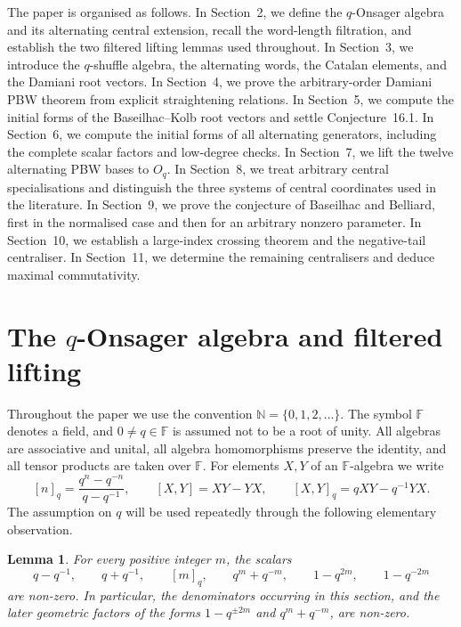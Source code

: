 \documentclass[11pt]{extarticle}
\newtheorem{lemma}[theorem]{Lemma}
\theoremstyle{definition}
\theoremstyle{remark}
\numberwithin{equation}{section}
\newcommand{\F}{\mathbb F}
\newcommand{\N}{\mathbb N}
\newcommand{\Oq}{O_q}
\newcommand{\qcomm}[2]{[ #1,#2 ]_q}
\newcommand{\comm}[2]{[ #1,#2 ]}
\begin{document}
The paper is organised as follows.  In Section~2, we define the
$q$-Onsager algebra and its alternating central extension, recall the
word-length filtration, and establish the two filtered lifting lemmas used
throughout.  In Section~3, we introduce the $q$-shuffle algebra, the
alternating words, the Catalan elements, and the Damiani root vectors.  In
Section~4, we prove the arbitrary-order Damiani PBW theorem from explicit
straightening relations.  In Section~5, we compute the initial forms of the
Baseilhac--Kolb root vectors and settle Conjecture~16.1.  In Section~6, we
compute the initial forms of all alternating generators, including the
complete scalar factors and low-degree checks.  In Section~7, we lift the
twelve alternating PBW bases to $\Oq$.  In Section~8, we treat arbitrary
central specialisations and distinguish the three systems of central
coordinates used in the literature.  In Section~9, we prove the conjecture
of Baseilhac and Belliard, first in the normalised case and then for an
arbitrary nonzero parameter.  In Section~10, we establish a large-index
crossing theorem and the negative-tail centraliser.  In Section~11, we
determine the remaining centralisers and deduce maximal commutativity.

\section{The \texorpdfstring{$q$}{q}-Onsager algebra and filtered lifting}
\label{sec:prelim}

Throughout the paper we use the convention
\(\N=\{0,1,2,\ldots\}\).  The symbol \(\F\) denotes a field, and
\(0\neq q\in\F\) is assumed not to be a root of unity.  All algebras are
associative and unital, all algebra homomorphisms preserve the identity,
and all tensor products are taken over \(\F\).  For elements \(X,Y\) of an
\(\F\)-algebra we write
\[
 [n]_q=\frac{q^n-q^{-n}}{q-q^{-1}},\qquad
 \comm{X}{Y}=XY-YX,\qquad
 \qcomm{X}{Y}=qXY-q^{-1}YX .
\]
The assumption on \(q\) will be used repeatedly through the following
elementary observation.

\begin{lemma}\label{lem:nonvanishing-scalars}
For every positive integer \(m\), the scalars
\[
 q-q^{-1},\qquad q+q^{-1},\qquad [m]_q,\qquad
 q^m+q^{-m},\qquad 1-q^{2m},\qquad 1-q^{-2m}
\]
are non-zero.  In particular, the denominators occurring in this section,
and the later geometric factors of the forms \(1-q^{\pm 2m}\) and
\(q^m+q^{-m}\), are non-zero.
\end{lemma}
\end{document}
